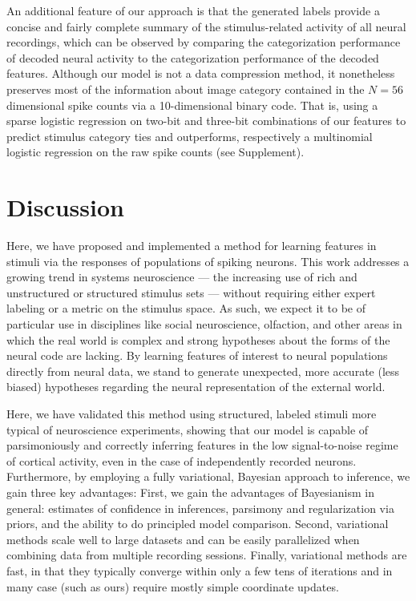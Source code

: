 \documentclass[12pt,a4paper]{article}
\begin{document}
An additional feature of our approach is that the generated labels provide a concise and fairly complete summary of the stimulus-related activity of all neural recordings, which can be observed by comparing the categorization performance of decoded neural activity to the categorization performance of the decoded features. Although our model is not a data compression method, it nonetheless preserves most of the information about image category contained in the $N=56$ dimensional spike counts via a 10-dimensional binary code. That is, using a sparse logistic regression on two-bit and three-bit combinations of our features to predict stimulus category ties and outperforms, respectively a multinomial logistic regression on the raw spike counts (see Supplement).

\section*{Discussion}

Here, we have proposed and implemented a method for learning features in stimuli via the responses of populations of spiking neurons. This work addresses a growing trend in systems neuroscience --- the increasing use of rich and unstructured or structured stimulus sets --- without requiring either expert labeling or a metric on the stimulus space. As such, we expect it to be of particular use in disciplines like social neuroscience, olfaction, and other areas in which the real world is complex and strong hypotheses about the forms of the neural code are lacking. By learning features of interest to neural populations directly from neural data, we stand to generate unexpected, more accurate (less biased) hypotheses regarding the neural representation of the external world.

Here, we have validated this method using structured, labeled stimuli more typical of neuroscience experiments, showing that our model is capable of parsimoniously and correctly inferring features in the low signal-to-noise regime of cortical activity, even in the case of independently recorded neurons. Furthermore, by employing a fully variational, Bayesian approach to inference, we gain three key advantages: First, we gain the advantages of Bayesianism in general: estimates of confidence in inferences, parsimony and regularization via priors, and the ability to do principled model comparison. Second, variational methods scale well to large datasets and can be easily parallelized when combining data from multiple recording sessions. Finally, variational methods are fast, in that they typically converge within only a few tens of iterations and in many case (such as ours) require mostly simple coordinate updates.
\end{document}
